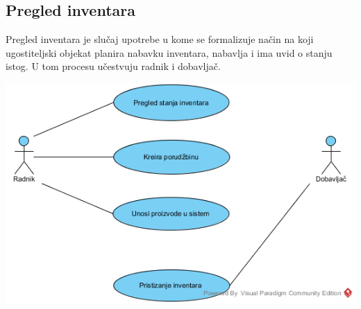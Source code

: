 \documentclass{article}
\begin{document}

\subsection{Pregled inventara}
Pregled inventara je slučaj upotrebe u kome se formalizuje način na koji ugostiteljski objekat planira nabavku inventara, nabavlja i ima uvid o stanju istog. U tom procesu učestvuju radnik i dobavljač. 

\includegraphics[width=\textwidth]{SU_2_pregled_inventara.png}
\end{document}
